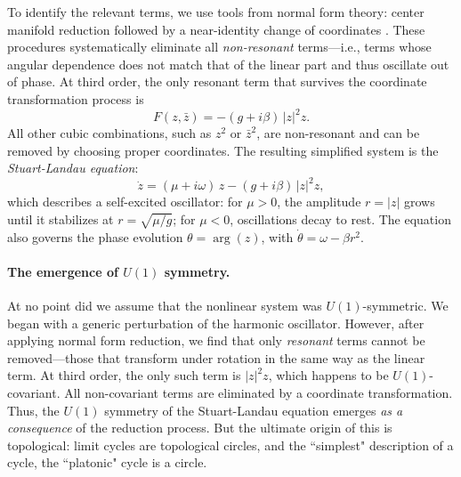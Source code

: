 To identify the relevant terms, we use tools from normal form theory: center manifold reduction followed by a near-identity change of coordinates \cite{guckenheimer2013nonlinear,kuznecovElementsAppliedBifurcation1995}. These procedures systematically eliminate all \emph{non-resonant} terms---i.e., terms whose angular dependence does not match that of the linear part and thus oscillate out of phase. At third order, the only resonant term that survives the coordinate transformation process is
\[
F(z,\bar z) = - (g + i\beta)\,|z|^2 z.
\]
All other cubic combinations, such as $z^2$ or $\bar z^2$, are non-resonant and can be removed by choosing proper coordinates. The resulting simplified system is the \emph{Stuart-Landau equation}:
\[
\dot z = (\mu + i\omega)\,z - (g + i\beta)\,|z|^2 z,
\]
which describes a self-excited oscillator: for $\mu > 0$, the amplitude $r = |z|$ grows until it stabilizes at $r = \sqrt{\mu/g}$; for $\mu < 0$, oscillations decay to rest. The equation also governs the phase evolution $\theta = \arg(z)$, with $\dot\theta = \omega - \beta r^2$.

\paragraph{The emergence of \texorpdfstring{$U(1)$}{U(1)} symmetry.}
At no point did we assume that the nonlinear system was $U(1)$-symmetric. We began with a generic perturbation of the harmonic oscillator. However, after applying normal form reduction, we find that only \emph{resonant} terms cannot be removed—those that transform under rotation in the same way as the linear term. At third order, the only such term is $|z|^2 z$, which happens to be $U(1)$-covariant. All non-covariant terms are eliminated by a coordinate transformation. Thus, the $U(1)$ symmetry of the Stuart-Landau equation emerges \emph{as a consequence} of the reduction process.  But the ultimate origin of this is topological: limit cycles are topological circles, and the ``simplest" description of a cycle, the ``platonic" cycle is a circle.

